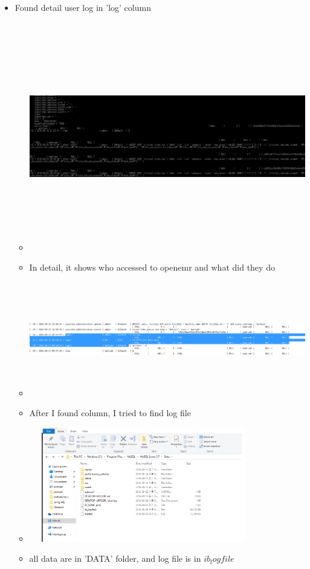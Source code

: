 \documentclass[paper=a4, fontsize=11pt]{scrartcl} %
\numberwithin{equation}{section} %
\numberwithin{figure}{section} %
\numberwithin{table}{section} %
\begin{document}
\begin{itemize}
	\item Found detail user log in 'log' column
		\begin{itemize}	
			\item
			 \includegraphics[width = 35cm, height=10cm]{pictures/LOGDATADETAIL.png}
			\item In detail, it shows who accessed to openemr and what did they do
			\item \includegraphics[width = 35cm, height=5cm]{pictures/whologinlog.png}
\vspace{5cm}
			\item After I found column, I tried to find log file
			\item \includegraphics[width = 10cm, height=5cm]{pictures/wherelog.png}
			\item all data are in 'DATA' folder, and log file is in $ib_logfile$
			

\end{itemize}
\end{itemize}
\end{document}
